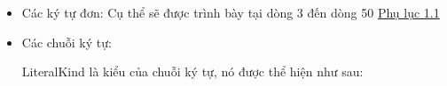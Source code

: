 \begin{itemize}
  \item Các ký tự đơn: Cụ thể sẽ được trình bày tại dòng 3 đến dòng 50 \hyperref[ap1:simple_token]{Phụ lục 1.1}

  \item Các chuỗi ký tự:
  
  

    LiteralKind là kiểu của chuỗi ký tự, nó được thể hiện như sau:


\end{itemize}
